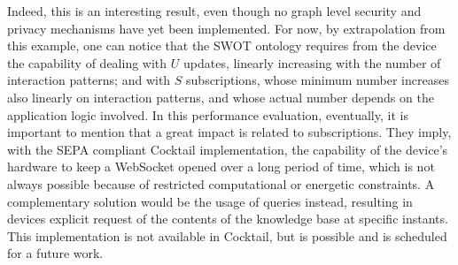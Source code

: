 Indeed, this is an interesting result, even though no graph level security and privacy mechanisms have yet been implemented. For now, by extrapolation from this example, one can notice that the SWOT ontology requires from the device the capability of dealing with $U$ updates, linearly increasing with the number of interaction patterns; and with $S$ subscriptions, whose minimum number increases also linearly on interaction patterns, and whose actual number depends on the application logic involved. In this performance evaluation, eventually, it is important to mention that a great impact is related to subscriptions. They imply, with the SEPA compliant Cocktail implementation, the capability of the device's hardware to keep a WebSocket opened over a long period of time, which is not always possible because of restricted computational or energetic constraints. A complementary solution would be the usage of queries instead, resulting in devices explicit request of the contents of the knowledge base at specific instants. This implementation is not available in Cocktail, but is possible and is scheduled for a future work.


